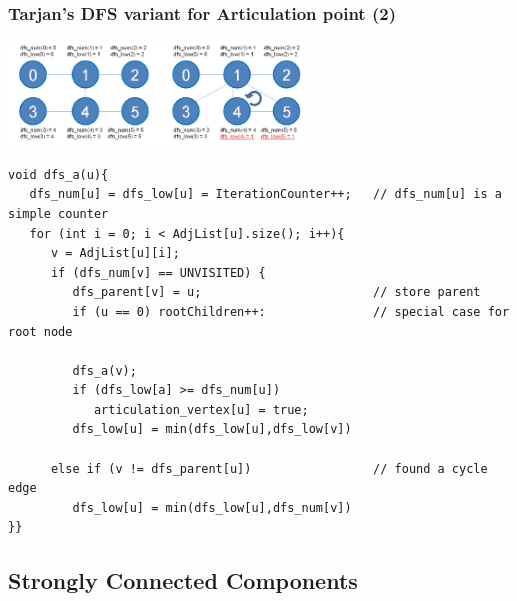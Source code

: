 \begin{frame}[fragile]
  \frametitle{Tarjan's DFS variant for Articulation point (2)}
  \begin{center}
    \includegraphics[width=0.6\textwidth]{../img/graph_articulation}
  \end{center}

{\tiny
  \begin{exampleblock}{}
\begin{verbatim}
void dfs_a(u){
   dfs_num[u] = dfs_low[u] = IterationCounter++;   // dfs_num[u] is a simple counter
   for (int i = 0; i < AdjList[u].size(); i++){
      v = AdjList[u][i];
      if (dfs_num[v] == UNVISITED) {
         dfs_parent[v] = u;                        // store parent
         if (u == 0) rootChildren++:               // special case for root node

         dfs_a(v);
         if (dfs_low[a] >= dfs_num[u])
            articulation_vertex[u] = true;
         dfs_low[u] = min(dfs_low[u],dfs_low[v])

      else if (v != dfs_parent[u])                 // found a cycle edge
         dfs_low[u] = min(dfs_low[u],dfs_num[v])
}}
\end{verbatim}
  \end{exampleblock}}
\end{frame}

\subsection{Strongly Connected Components}

